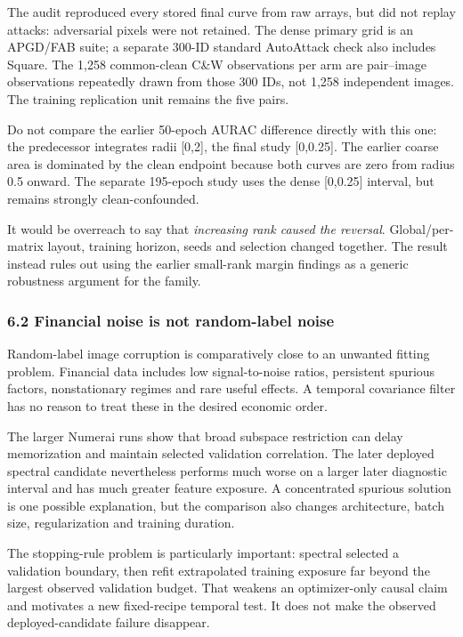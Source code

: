 \documentclass[
  british,
  10pt,
  a4paper,
]{article}
\begin{document}
The audit reproduced every stored final curve from raw arrays, but did
not replay attacks: adversarial pixels were not retained. The dense
primary grid is an APGD/FAB suite; a separate 300-ID standard AutoAttack
check also includes Square. The 1,258 common-\allowbreak{}clean C\&W
observations per arm are pair--image observations repeatedly drawn from
those 300 IDs, not 1,258 independent images. The training replication
unit remains the five pairs.

Do not compare the earlier 50-epoch AURAC difference directly with this
one: the predecessor integrates radii {[}0,2{]}, the final study
{[}0,0.25{]}. The earlier coarse area is dominated by the clean endpoint
because both curves are zero from radius 0.5 onward. The separate
195-epoch study uses the dense {[}0,0.25{]} interval, but remains
strongly clean-\allowbreak{}confounded.\allowbreak{}

It would be overreach to say that \emph{increasing rank caused the
reversal}. Global/\allowbreak{}per-\allowbreak{}matrix layout, training
horizon, seeds and selection changed together. The result instead rules
out using the earlier small-rank margin findings as a generic robustness
argument for the family.

\subsubsection{\texorpdfstring{6.2 Financial noise is not
random-\allowbreak{}label
noise}{6.2 Financial noise is not  noise}}\label{synthesis--financial-noise-is-not-random-label-noise}

Random-\allowbreak{}label image corruption is comparatively close to an
unwanted fitting problem. Financial data includes low
signal-\allowbreak{}to-\allowbreak{}noise ratios, persistent spurious
factors, nonstationary regimes and rare useful effects. A temporal
covariance filter has no reason to treat these in the desired economic
order.

The larger Numerai runs show that broad subspace restriction can delay
memorization and maintain selected validation correlation.\allowbreak{}
The later deployed spectral candidate nevertheless performs much worse
on a larger later diagnostic interval and has much greater feature
exposure. A concentrated spurious solution is one possible
explanation,\allowbreak{} but the comparison also changes
architecture\allowbreak{},\allowbreak{} batch size, regularization and
training duration.

The stopping-\allowbreak{}rule problem is particularly important:
spectral selected a validation boundary, then refit extrapolated
training exposure far beyond the largest observed validation budget.
That weakens an optimizer-\allowbreak{}only causal claim and motivates a
new fixed-\allowbreak{}recipe temporal test. It does not make the
observed deployed-\allowbreak{}candidate failure disappear.
\end{document}
